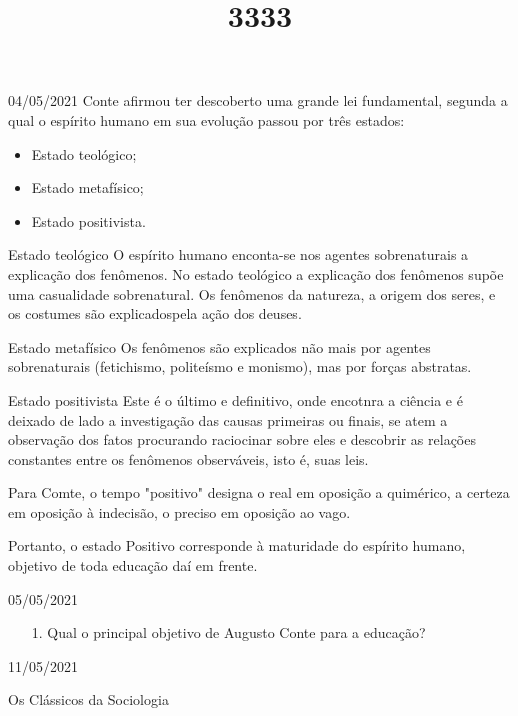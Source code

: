 \documentclass{SchoolBook}
\begin{document}
    \begin{day}{04/05/2021}
        Conte afirmou ter descoberto uma grande lei fundamental, segunda a qual o espírito humano em sua evolução passou por três estados:

        \vspace{6pt}
        \begin{itemize}[nosep]
            \item Estado teológico;
            \item Estado metafísico;
            \item Estado positivista.
        \end{itemize}

        \title{3}{Estado teológico}
        O espírito humano enconta-se nos agentes sobrenaturais a explicação dos fenômenos. No estado teológico a explicação dos fenômenos supõe uma casualidade sobrenatural. Os fenômenos da natureza, a origem dos seres, e os costumes são explicadospela ação dos deuses.

        \title{3}{Estado metafísico}
        Os fenômenos são explicados não mais por agentes sobrenaturais (fetichismo, politeísmo e monismo), mas por forças abstratas.

        \title{3}{Estado positivista}
        Este é o último e definitivo, onde encotnra a ciência e é deixado de lado a investigação das causas primeiras ou finais, se atem a observação dos fatos procurando raciocinar sobre eles e descobrir as relações constantes entre os fenômenos observáveis, isto é, suas leis.
        
        Para Comte, o tempo "positivo" designa o real em oposição a quimérico, a certeza em oposição à indecisão, o preciso em oposição ao vago.
        
        Portanto, o estado Positivo corresponde à maturidade do espírito humano, objetivo de toda educação daí em frente.
    \end{day}
    
    \begin{day}{05/05/2021}
        \begin{enumerate}
            \item[1.] Qual o principal objetivo de Augusto Conte para a educação?
        \end{enumerate}
    \end{day}
    
    \begin{day}{11/05/2021}
        \title{3}{Os Clássicos da Sociologia}
        
        
    \end{day}
\end{document}
